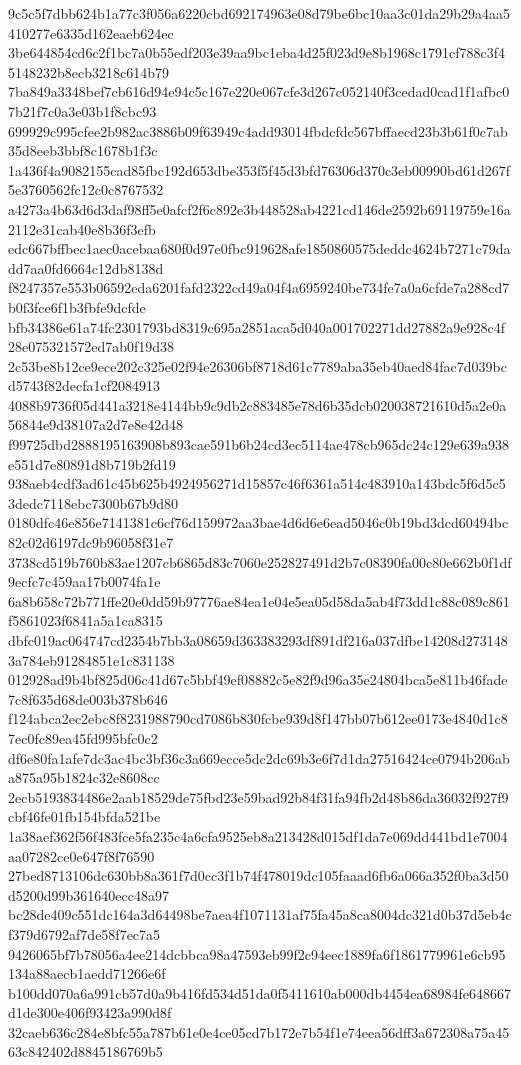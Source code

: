 {9c5c5f7dbb624b1a77c3f056a6220cbd692174963e08d79be6bc10aa3c01da29b29a4aa5410277e6335d162eaeb624ec
3be644854cd6c2f1bc7a0b55edf203e39aa9bc1eba4d25f023d9e8b1968c1791cf788c3f45148232b8ecb3218c614b79
7ba849a3348bef7cb616d94e94c5c167e220e067cfe3d267c052140f3cedad0cad1f1afbc07b21f7c0a3e03b1f8cbc93
699929c995cfee2b982ac3886b09f63949c4add93014fbdcfdc567bffaecd23b3b61f0c7ab35d8eeb3bbf8c1678b1f3c
1a436f4a9082155cad85fbc192d653dbe353f5f45d3bfd76306d370c3eb00990bd61d267f5e3760562fc12c0c8767532
a4273a4b63d6d3daf98ff5e0afcf2f6c892e3b448528ab4221cd146de2592b69119759e16a2112e31cab40e8b36f3efb
edc667bffbec1aec0acebaa680f0d97e0fbc919628afe1850860575deddc4624b7271c79dadd7aa0fd6664c12db8138d
f8247357e553b06592eda6201fafd2322cd49a04f4a6959240be734fe7a0a6cfde7a288cd7b0f3fce6f1b3fbfe9dcfde
bfb34386e61a74fc2301793bd8319c695a2851aca5d040a001702271dd27882a9e928c4f28e075321572ed7ab0f19d38
2c53be8b12ce9ece202c325e02f94e26306bf8718d61c7789aba35eb40aed84fac7d039bcd5743f82decfa1cf2084913
4088b9736f05d441a3218e4144bb9c9db2c883485e78d6b35dcb020038721610d5a2e0a56844e9d38107a2d7e8e42d48
f99725dbd2888195163908b893cae591b6b24cd3ec5114ae478cb965dc24c129e639a938e551d7e80891d8b719b2fd19
938aeb4cdf3ad61c45b625b4924956271d15857c46f6361a514c483910a143bdc5f6d5c53dedc7118ebc7300b67b9d80
0180dfc46e856e7141381c6cf76d159972aa3bae4d6d6e6ead5046c0b19bd3dcd60494bc82c02d6197dc9b96058f31e7
3738cd519b760b83ae1207cb6865d83c7060e252827491d2b7c08390fa00c80e662b0f1df9ecfc7c459aa17b0074fa1e
6a8b658c72b771ffe20e0dd59b97776ae84ea1e04e5ea05d58da5ab4f73dd1c88c089c861f5861023f6841a5a1ca8315
dbfc019ac064747cd2354b7bb3a08659d363383293df891df216a037dfbe14208d2731483a784eb91284851e1c831138
012928ad9b4bf825d06c41d67c5bbf49ef08882c5e82f9d96a35e24804bca5e811b46fade7c8f635d68de003b378b646
f124abca2ec2ebc8f8231988790cd7086b830fcbe939d8f147bb07b612ee0173e4840d1c87ec0fc89ea45fd995bfc0c2
df6e80fa1afe7dc3ac4bc3bf36c3a669ecce5dc2dc69b3e6f7d1da27516424ce0794b206aba875a95b1824c32e8608cc
2ecb5193834486e2aab18529de75fbd23e59bad92b84f31fa94fb2d48b86da36032f927f9cbf46fe01fb154bfda521be
1a38aef362f56f483fce5fa235c4a6cfa9525eb8a213428d015df1da7e069dd441bd1e7004aa07282ce0e647f8f76590
27bed8713106dc630bb8a361f7d0cc3f1b74f478019dc105faaad6fb6a066a352f0ba3d50d5200d99b361640ecc48a97
bc28de409c551dc164a3d64498be7aea4f1071131af75fa45a8ca8004dc321d0b37d5eb4cf379d6792af7de58f7ec7a5
9426065bf7b78056a4ee214dcbbca98a47593eb99f2c94eec1889fa6f1861779961e6cb95134a88aecb1aedd71266e6f
b100dd070a6a991cb57d0a9b416fd534d51da0f5411610ab000db4454ea68984fe648667d1de300e406f93423a990d8f
32caeb636c284e8bfc55a787b61e0e4ce05cd7b172e7b54f1e74eea56dff3a672308a75a4563c842402d8845186769b5
}
